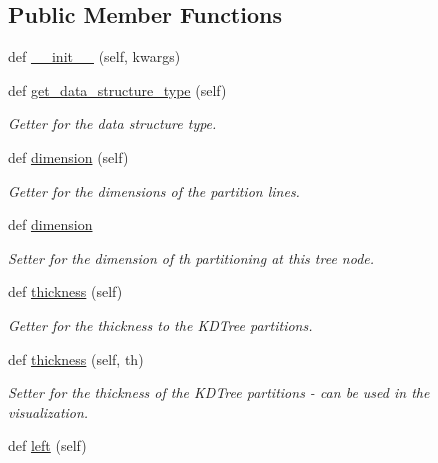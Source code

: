 \subsection*{Public Member Functions}
\begin{DoxyCompactItemize}
\item 
def \hyperlink{classbridges_1_1kd__tree__element_1_1_k_d_tree_element_adf6832855ce0ca7dfe126362a704cf70}{\+\_\+\+\_\+init\+\_\+\+\_\+} (self, kwargs)
\item 
def \hyperlink{classbridges_1_1kd__tree__element_1_1_k_d_tree_element_ac76e921a6607344f18ccd45a07873f1b}{get\+\_\+data\+\_\+structure\+\_\+type} (self)
\begin{DoxyCompactList}\small\item\em Getter for the data structure type. \end{DoxyCompactList}\item 
def \hyperlink{classbridges_1_1kd__tree__element_1_1_k_d_tree_element_aab11eecb5130e0439850d4346de3b2cc}{dimension} (self)
\begin{DoxyCompactList}\small\item\em Getter for the dimensions of the partition lines. \end{DoxyCompactList}\item 
def \hyperlink{classbridges_1_1kd__tree__element_1_1_k_d_tree_element_aac549e5e0caa8dd294e1723c4eb70574}{dimension}
\begin{DoxyCompactList}\small\item\em Setter for the dimension of th partitioning at this tree node. \end{DoxyCompactList}\item 
def \hyperlink{classbridges_1_1kd__tree__element_1_1_k_d_tree_element_a2eead168d39e301505c079c0100d9c94}{thickness} (self)
\begin{DoxyCompactList}\small\item\em Getter for the thickness to the K\+D\+Tree partitions. \end{DoxyCompactList}\item 
def \hyperlink{classbridges_1_1kd__tree__element_1_1_k_d_tree_element_a925bbd5ef368d6bbce4c316ec8815bf7}{thickness} (self, th)
\begin{DoxyCompactList}\small\item\em Setter for the thickness of the K\+D\+Tree partitions -\/ can be used in the visualization. \end{DoxyCompactList}\item 
def \hyperlink{classbridges_1_1kd__tree__element_1_1_k_d_tree_element_afa4f059c61b3cd9460199c9835641db2}{left} (self)

\end{DoxyCompactItemize}

